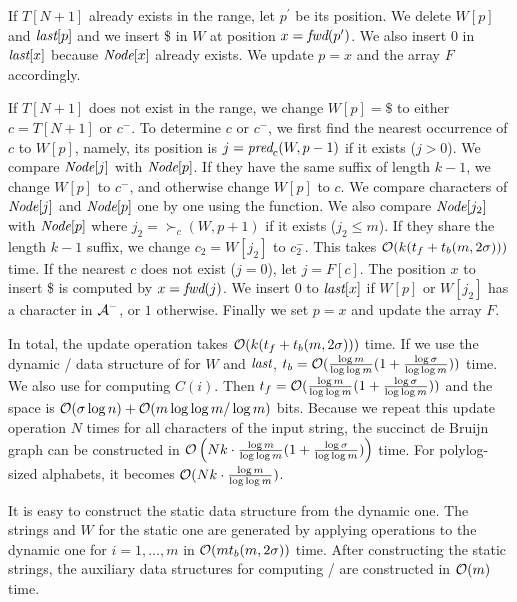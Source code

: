 If $T[N+1]$ already exists in the range, let $p^\prime$ be its position.
We delete $W[p]$ and ${\textit{last}}[p]$ and we insert \$ in $W$ at position $x = {\textit{fwd}}(p^\prime)$.
We also insert $0$ in ${\textit{last}}[x]$ because ${\textit{Node}}[x]$ already exists.
We update $p = x$ and the array $F$ accordingly.

If $T[N+1]$ does not exist in the range,
we change $W[p] = \$ $ to either $c = T[N+1]$ or $c^-$.
To determine $c$ or $c^-$, we first find the nearest occurrence of $c$ to $W[p]$,
namely, its position is $j = {\textit{pred}}_c(W, p-1)$ if it exists ($j > 0$).
We compare ${\textit{Node}}[j]$ with ${\textit{Node}}[p]$.  If they have the same suffix of length $k-1$,
we change $W[p]$ to $c^-$, and otherwise change $W[p]$ to $c$.
We compare characters of ${\textit{Node}}[j]$ and ${\textit{Node}}[p]$ one by one using the {\bwd} function.
We also compare ${\textit{Node}}[j_2]$ with ${\textit{Node}}[p]$ where
$j_2 = {\succ}_c(W, p+1)$ if it exists ($j_2 \le m$).
If they share the length $k-1$ suffix, we change $c_2 = W[j_2]$ to $c_2^-$.
This takes $\mathcal{O}(k(t_f + t_b(m,2\sigma)))$ time.
If the nearest $c$ does not exist ($j = 0$), let $j = F[c]$.
The position $x$ to insert \$ is computed by $x = {\textit{fwd}}(j)$.
We insert $0$ to ${\textit{last}}[x]$ if $W[p]$ or $W[j_2]$ has a character in ${\cal A}^-$,
or $1$ otherwise.  Finally we set $p = x$ and update the array $F$.

In total, the update operation takes 
$\mathcal{O}(k(t_f + t_b(m,2\sigma)))$ time.
If we use the dynamic {\rank}/{\select} data structure of \cite{NavSad10}
for $W$ and ${\textit{last}}$, $t_b = \mathcal{O}(\frac{\log m}{\log \log m}(1+\frac{\log\sigma}{\log\log m}))$ time.
We also use \cite{NavSad10} for computing $C(i)$.  Then $t_f = \mathcal{O}(\frac{\log m }{\log \log m}(1+\frac{\log\sigma}{\log\log m}))$
and the space is $\mathcal{O}(\sigma \log n) + \mathcal{O}(m \log \log m/\log m)$ bits.
Because we repeat this update operation $N$ times for all characters of the input string,
the succinct de Bruijn graph can be constructed in
$\mathcal{O}\left(Nk \cdot \frac{\log m}{\log \log m}
(1+\frac{\log\sigma}{\log\log m})\right)$ time.
For polylog-sized alphabets, it becomes $\mathcal{O}(Nk \cdot \frac{\log m}{\log \log m})$.

It is easy to construct the static data structure from the dynamic one.
The strings {\last} and $W$ for the static one are generated by
applying {\access} operations to the dynamic one for $i=1,\ldots,m$
in $\mathcal{O}(m t_b(m,2\sigma))$ time.
After constructing the static strings, the auxiliary data structures for
computing {\rank}/{\select} are constructed in $\mathcal{O}(m)$ time.


